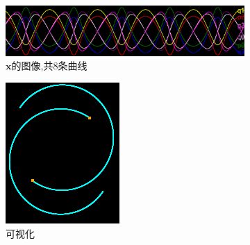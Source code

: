 \documentclass[12pt]{article}
\begin{document}
\begin{figure}[h]
  \centering
  \begin{subfigure}[b]{0.6\linewidth}
    \includegraphics[width=\linewidth]{kepler_2_body_graph.png}
    \caption{$\mathbf x$的图像,共8条曲线}
  \end{subfigure}
  \begin{subfigure}[b]{0.15\linewidth}
    \includegraphics[width=\linewidth]{kepler_2_body_trace.png}
    \caption{可视化}
  \end{subfigure}
  \begin{subfigure}[b]{0.2\linewidth}

\end{subfigure}
\end{figure}
\end{document}
